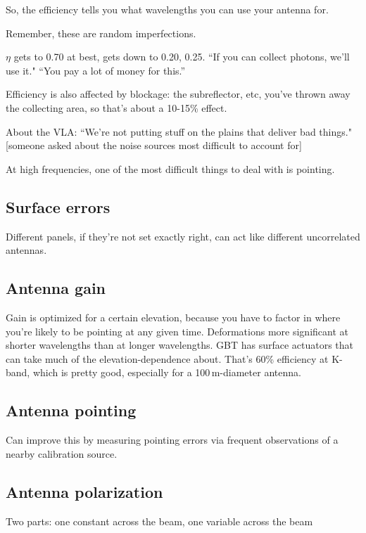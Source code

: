 \documentclass[a4paper]{article}
\begin{document}
So, the efficiency tells you what wavelengths you can use your antenna for. 

Remember, these are random imperfections.

$\eta$ gets to 0.70 at best, gets down to 0.20, 0.25. ``If you can collect photons, we'll use it." ``You pay a lot of money for this.''

Efficiency is also affected by blockage: the subreflector, etc, you've thrown away the collecting area, so that's about a 10-15\% effect. 

About the VLA: ``We're not putting stuff on the plains that deliver bad things." [someone asked about the noise sources most difficult to account for]

At high frequencies, one of the most difficult things to deal with is pointing. 

\subsection{Surface errors}

Different panels, if they're not set exactly right, can act like different uncorrelated antennas. 

\subsection{Antenna gain}

Gain is optimized for a certain elevation, because you have to factor in where you're likely to be pointing at any given time. Deformations more significant at shorter wavelengths than at longer wavelengths. GBT has surface actuators that can take much of the elevation-dependence about. That's 60\% efficiency at K-band, which is pretty good, especially for a 100\,m-diameter antenna.

\subsection{Antenna pointing}

Can improve this by measuring pointing errors via frequent observations of a nearby calibration source. 

\subsection{Antenna polarization}

Two parts: one constant across the beam, one variable across the beam
\end{document}
